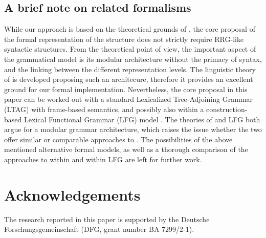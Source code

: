 \documentclass[output=paper,colorlinks,citecolor=brown]{langscibook}
\begin{document}
\subsection{A brief note on related formalisms}

While our approach is based on the theoretical grounds of , the core proposal of the formal representation of the  structure does not strictly require RRG-like syntactic structures. From the theoretical point of view, the important aspect of the grammatical model is its modular architecture without the primacy of syntax, and the linking between the different representation levels. The linguistic theory of  is developed proposing such an architecure, therefore it provides an excellent ground for our formal implementation. Nevertheless, the core proposal in this paper can be worked out with a standard Lexicalized Tree-Adjoining Grammar (LTAG) with frame-based semantics, and possibly also within a construction-based Lexical Functional Grammar (LFG) model \citep[e.g.,][]{findlay:23}. The theories of  and LFG both argue for a modular grammar architecture, which raises the issue whether the two offer similar or comparable approaches to . The possibilities of the above mentioned alternative formal models, as well as a thorough comparison of the approaches to  within  \citep[see, e.g.,][]{vvlp:97,vanvalin:05,bentley:23} and within LFG \citep[see, e.g.,][]{butt:king:96,dalrymple:nikolaeva:11,dalrymple:etal:19,zaenen:23} are left for further work. 

\section*{Acknowledgements}
The research reported in this paper is supported by the Deutsche Forschungsgemeinschaft (DFG, grant number BA 7299/2-1). 

\sloppy
\printbibliography[heading=subbibliography,notkeyword=this]
\end{document}
